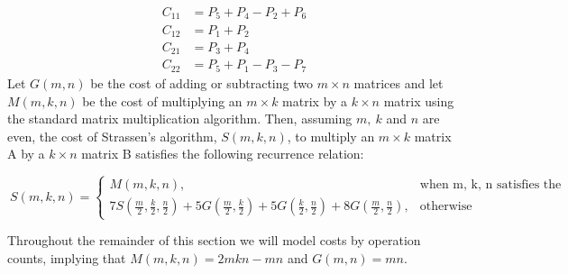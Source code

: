 \documentclass[UTF8]{ctexart}
\begin{document}
\begin{equation}
  \begin{aligned}
    C_{11} & =P_5+P_4-P_2+P_6 \\
    C_{12} & =P_1+P_2         \\
    C_{21} & =P_3+P_4         \\
    C_{22} & =P_5+P_1-P_3-P_7
  \end{aligned}
\end{equation}
Let $G(m, n)$ be the cost of adding or subtracting two $m\times n$ matrices and let $M(m,k,n)$ be the cost of multiplying an $m \times k$ matrix by a $k\times n$ matrix using the standard matrix multiplication algorithm. Then, assuming $m,\ k$  and  $n$  are even, the cost of Strassen's algorithm, $S(m, k, n)$, to multiply an $m\times k$ matrix A by a $k\times n$ matrix B satisfies the following recurrence relation:

\begin{equation}
  \ S(m,k,n) = \begin{cases} M(m,k,n), & \text{when m, k, n satisfies the cutoff criterion}\\ 7S(\frac{m}{2},\frac{k}{2},\frac{n}{2})+5G(\frac{m}{2},\frac{k}{2})+5G(\frac{k}{2},\frac{n}{2})+8G(\frac{m}{2},\frac{n}{2}), & \text{otherwise} \end{cases}
\end{equation}

Throughout the remainder of this section we will model costs by operation counts, implying that $M(m,k,n)=2mkn-mn$ and $G(m,n)=mn$.
\end{document}
